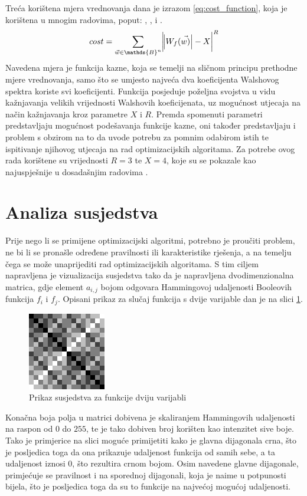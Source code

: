 Treća korištena mjera vrednovanja dana je izrazom \eqref{eq:cost_function}, koja je korištena u mnogim radovima, poput: \cite{MaximalNonlinearity}, \cite{CryptographicBoolean}, \cite{EvolvingBoolean} i \cite{picek2016new}.
\begin{equation}\label{eq:cost_function}
    cost = \sum_{\vec{w}\in \mathds{B}^n} \abs{\abs{W_f(\vec{w)}} - X}^R
\end{equation}
Navedena mjera je funkcija kazne, koja se temelji na sličnom principu prethodne mjere vrednovanja, samo što se umjesto najveća dva koeficijenta Walshovog spektra koriste svi koeficijenti.
Funkcija posjeduje poželjna svojstva u vidu kažnjavanja velikih vrijednosti Walshovih koeficijenata, uz mogućnost utjecaja na način kažnjavanja kroz parametre $X$ i $R$.
Premda spomenuti parametri predstavljaju mogućnost podešavanja funkcije kazne, oni također predstavljaju i problem s obzirom na to da uvode potrebu za pomnim odabirom istih te ispitivanje njihovog utjecaja na rad optimizacijskih algoritama.
Za potrebe ovog rada korištene su vrijednosti $R=3$ te $X=4$, koje su se pokazale kao najuspješnije u dosadašnjim radovima \cite{EvolvingBoolean}.

\section{Analiza susjedstva}
Prije nego li se primijene optimizacijski algoritmi, potrebno je proučiti problem, ne bi li se pronašle određene pravilnosti ili karakteristike rješenja, a na temelju čega se može unaprijediti rad optimizacijskih algoritama.
S tim ciljem napravljena je vizualizacija susjedstva tako da je napravljena dvodimenzionalna matrica, gdje element $a_{i, j}$ bojom odgovara Hammingovoj udaljenosti Booleovih funkcija $f_i$ i $f_j$.
Opisani prikaz za slučaj funkcija s dvije varijable dan je na slici \ref{fig:function_2}. 
\begin{figure}[ht!] 
    \centering
    \includegraphics[width=.4\textwidth]{img/function_2}
    \captionsetup{justification=centering}
    \caption{Prikaz susjedstva za funkcije dviju varijabli}
    \label{fig:function_2}
\end{figure}
Konačna boja polja u matrici dobivena je skaliranjem Hammingovih udaljenosti na raspon od $0$ do $255$, te je tako dobiven broj korišten kao intenzitet sive boje.
Tako je primjerice na slici moguće primijetiti kako je glavna dijagonala crna, što je posljedica toga da ona prikazuje udaljenost funkcija od samih sebe, a ta udaljenost iznosi $0$, što rezultira crnom bojom.
Osim navedene glavne dijagonale, primjećuje se pravilnost i na sporednoj dijagonali, koja je naime u potpunosti bijela, što je posljedica toga da su to funkcije na najvećoj mogućoj udaljenosti.

